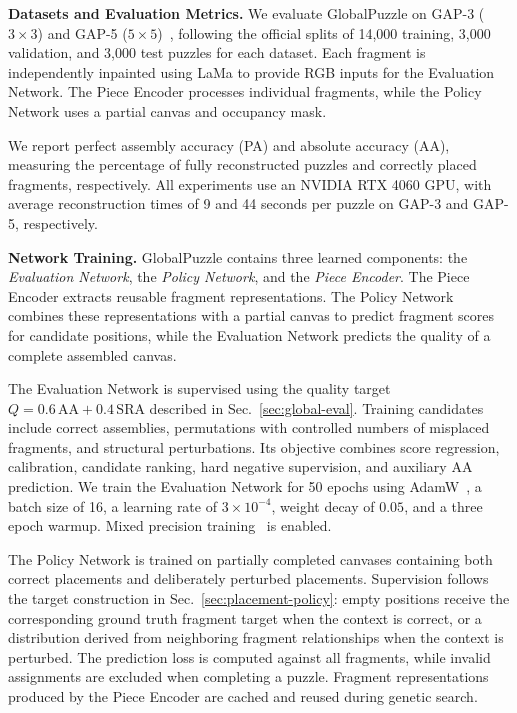 \documentclass[10pt,twocolumn,letterpaper]{article}
\begin{document}
\noindent\textbf{Datasets and Evaluation Metrics.}
We evaluate GlobalPuzzle on GAP-3 ($3\times3$) and GAP-5 ($5\times5$)~\cite{shahar2026gap}, following the official splits of 14,000 training, 3,000 validation, and 3,000 test puzzles for each dataset. Each fragment is independently inpainted using LaMa to provide RGB inputs for the Evaluation Network. The Piece Encoder processes individual fragments, while the Policy Network uses a partial canvas and occupancy mask.

We report perfect assembly accuracy (PA) and absolute accuracy (AA), measuring the percentage of fully reconstructed puzzles and correctly placed fragments, respectively. All experiments use an NVIDIA RTX 4060 GPU, with average reconstruction times of 9 and 44 seconds per puzzle on GAP-3 and GAP-5, respectively.

\noindent
\textbf{Network Training.}
GlobalPuzzle contains three learned components: the \emph{Evaluation Network}, the \emph{Policy Network}, and the \emph{Piece Encoder}. The Piece Encoder extracts reusable fragment representations. The Policy Network combines these representations with a partial canvas to predict fragment scores for candidate positions, while the Evaluation Network predicts the quality of a complete assembled canvas.

The Evaluation Network is supervised using the quality target $Q=0.6\,\mathrm{AA}+0.4\,\mathrm{SRA}$ described in Sec.~\ref{sec:global-eval}. Training candidates include correct assemblies, permutations with controlled numbers of misplaced fragments, and structural perturbations. Its objective combines score regression, calibration, candidate ranking, hard negative supervision, and auxiliary AA prediction. We train the Evaluation Network for 50 epochs using AdamW~\cite{loshchilov2019adamw}, a batch size of 16, a learning rate of $3\times10^{-4}$, weight decay of $0.05$, and a three epoch warmup. Mixed precision training~\cite{micikevicius2018mixed} is enabled.

The Policy Network is trained on partially completed canvases containing both correct placements and deliberately perturbed placements. Supervision follows the target construction in Sec.~\ref{sec:placement-policy}: empty positions receive the corresponding ground truth fragment target when the context is correct, or a distribution derived from neighboring fragment relationships when the context is perturbed. The prediction loss is computed against all fragments, while invalid assignments are excluded when completing a puzzle. Fragment representations produced by the Piece Encoder are cached and reused during genetic search.
\end{document}
